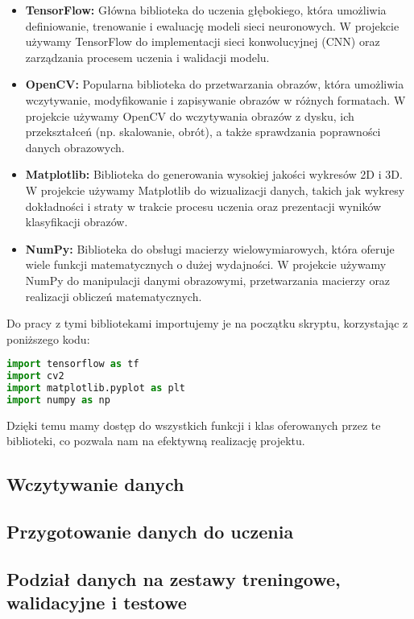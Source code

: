 \begin{itemize}
\item \textbf{TensorFlow:} Główna biblioteka do uczenia głębokiego, która umożliwia definiowanie, trenowanie i ewaluację modeli sieci neuronowych. W projekcie używamy TensorFlow do implementacji sieci konwolucyjnej (CNN) oraz zarządzania procesem uczenia i walidacji modelu.

\item \textbf{OpenCV:} Popularna biblioteka do przetwarzania obrazów, która umożliwia wczytywanie, modyfikowanie i zapisywanie obrazów w różnych formatach. W projekcie używamy OpenCV do wczytywania obrazów z dysku, ich przekształceń (np. skalowanie, obrót), a także sprawdzania poprawności danych obrazowych.

\item \textbf{Matplotlib:} Biblioteka do generowania wysokiej jakości wykresów 2D i 3D. W projekcie używamy Matplotlib do wizualizacji danych, takich jak wykresy dokładności i straty w trakcie procesu uczenia oraz prezentacji wyników klasyfikacji obrazów.

\item \textbf{NumPy:} Biblioteka do obsługi macierzy wielowymiarowych, która oferuje wiele funkcji matematycznych o dużej wydajności. W projekcie używamy NumPy do manipulacji danymi obrazowymi, przetwarzania macierzy oraz realizacji obliczeń matematycznych.

\end{itemize}

Do pracy z tymi bibliotekami importujemy je na początku skryptu, korzystając z poniższego kodu:

\begin{lstlisting}[language=Python]
import tensorflow as tf
import cv2
import matplotlib.pyplot as plt
import numpy as np
\end{lstlisting}

Dzięki temu mamy dostęp do wszystkich funkcji i klas oferowanych przez te biblioteki, co pozwala nam na efektywną realizację projektu.

\subsection{Wczytywanie danych}
\subsection{Przygotowanie danych do uczenia}
\subsection{Podział danych na zestawy treningowe, walidacyjne i testowe}
